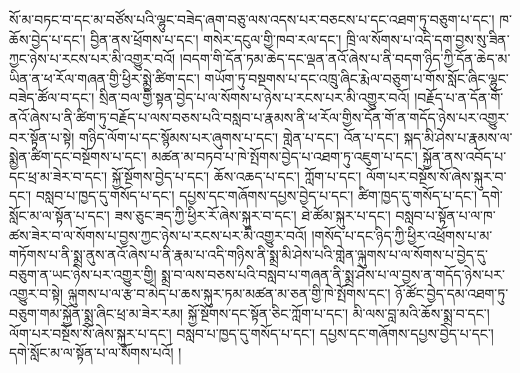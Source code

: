 སོ་མ་བཏང་བ་དང་མ་བཙོས་པའི་ལྷུང་བཟེད་ཞག་བཅུ་ལས་འདས་པར་བཅངས་པ་དང་འཐག་ཏུ་བཅུག་པ་དང་། ཁ་ཆོས་བྱེད་པ་དང་། བྱིན་ནས་ཕྲོགས་པ་དང་། གསེར་དངུལ་གྱི་ཁབ་རལ་དང་། ཁྲི་ལ་སོགས་པ་འདི་དག་བྱས་སུ་ཟིན་ཀྱང་ཉེས་པ་རངས་པར་མི་འགྱུར་བའོ། །བདག་གི་དོན་ཏམ་ཆེད་དང་ལྡན་ནའོ་ཞེས་པ་ནི་བདག་ཉིད་ཀྱི་དོན་ཆེད་མ་ཡིན་ན་ཕ་རོལ་གཞན་གྱི་ཕྱིར་སྨྱེ་ཚིག་དང་། གཡོག་ཏུ་བསྔགས་པ་དང་འཁྲུ་ཞིང་རྨེལ་བཅུག་པ་གོས་སློང་ཞིང་ལྷུང་བཟེད་ཚོལ་བ་དང་། སྲིན་བལ་གྱི་སྟན་བྱེད་པ་ལ་སོགས་པ་ཉེས་པ་རངས་པར་མི་འགྱུར་བའོ། །བརྗོད་པ་ན་དོན་གོ་ནའོ་ཞེས་པ་ནི་ཚིག་ཏུ་བརྗོད་པ་ལས་བཅས་པའི་བསླབ་པ་རྣམས་ནི་ཕ་རོལ་གྱིས་དོན་གོ་ན་གདོད་ཉེས་པར་འགྱུར་བར་སྟོན་པ་སྟེ། གཉིད་ལོག་པ་དང་སྙོམས་པར་ཞུགས་པ་དང་། གླེན་པ་དང་། འོན་པ་དང་། སྐད་མི་ཤེས་པ་རྣམས་ལ་སྨྱེན་ཚིག་དང་བསྔོགས་པ་དང་། མཚན་མ་བཏབ་པ་ཁེ་སྤོགས་བྱེད་པ་འཐག་ཏུ་འཇུག་པ་དང་། སྐྱོན་ནས་འབོད་པ་དང་ཕྲ་མ་ཟེར་བ་དང་། སྐྱོ་སྔོགས་བྱེད་པ་དང་། ཆོས་འཆད་པ་དང་། ཀློག་པ་དང་། ལོག་པར་བསྔོས་སོ་ཞེས་སྐུར་བ་དང་། བསླབ་པ་ཁྱད་དུ་གསོད་པ་དང་། དཔྱས་དང་གཞོགས་དཔྱས་བྱེད་པ་དང་། ཚིག་ཁྱད་དུ་གསོད་པ་དང་། དགེ་སློང་མ་ལ་སྟོན་པ་དང་། ཟས་ཅུང་ཟད་ཀྱི་ཕྱིར་རོ་ཞེས་སྐུར་བ་དང་། ཐེ་ཚོམ་སྐུར་པ་དང་། བསླབ་པ་སྟོན་པ་ལ་ཁ་ཚས་ཟེར་བ་ལ་སོགས་པ་བྱས་ཀྱང་ཉེས་པ་རངས་པར་མི་འགྱུར་བའོ། །གསོད་པ་དང་ཉིད་ཀྱི་ཕྱིར་འཕྲོགས་པ་མ་གཏོགས་པ་ནི་སྨྲ་ནུས་ནའོ་ཞེས་པ་ནི་རྣམ་པ་འདི་གཉིས་ནི་སྨྲ་མི་ཤེས་པའི་གླེན་ལྐུགས་པ་ལ་སོགས་པ་བྱེད་དུ་བཅུག་ན་ཡང་ཉེས་པར་འགྱུར་གྱི། སྨྲ་བ་ལས་བཅས་པའི་བསླབ་པ་གཞན་ནི་སྨྲ་ཤེས་པ་ལ་བྱས་ན་གདོད་ཉེས་པར་འགྱུར་བ་སྟེ། ལྐུགས་པ་ལ་རྩ་བ་མེད་པ་ཆས་སྐུར་ཏམ་མཚན་མ་ཅན་གྱི་ཁེ་སྤོགས་དང་། ཉོ་ཚོང་བྱེད་དམ་འཐག་ཏུ་བཅུག་གམ་སྐྱོན་སྨྲ་ཞིང་ཕྲ་མ་ཟེར་རམ། སྐྱོ་སྔོགས་དང་སྟོན་ཅིང་ཀློག་པ་དང་། མི་ལས་བླ་མའི་ཆོས་སྨྲ་བ་དང་། ལོག་པར་བསྔོས་སོ་ཞེས་སྐུར་པ་དང་། བསླབ་པ་ཁྱད་དུ་གསོད་པ་དང་། དཔྱས་དང་གཞོགས་དཔྱས་བྱེད་པ་དང་། དགེ་སློང་མ་ལ་སྟོན་པ་ལ་སོགས་པའོ། །
